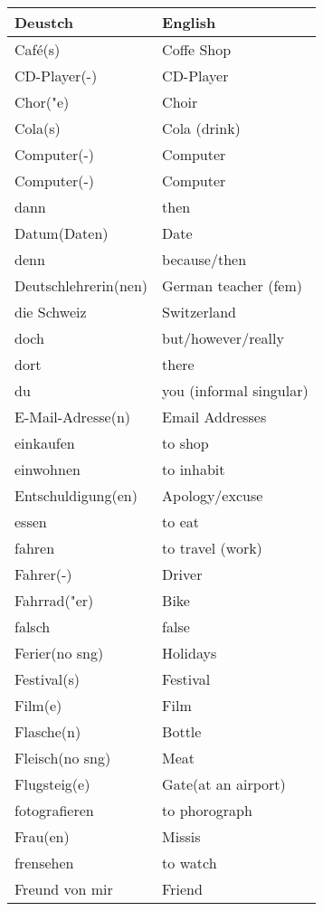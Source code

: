 \documentclass{article}
\renewcommand{\arraystretch}{1}
\begin{document}
\hfill
\begin{minipage}{0.48\textwidth}
    \centering
    \renewcommand{\arraystretch}{1.5}
    \begin{tabular}{|>{\raggedright\arraybackslash}p{3.5cm}|>{\raggedright\arraybackslash}p{3.5cm}|}
        \hline
        \rowcolor{gray!20} \textbf{Deustch} & \textbf{English} \\
        \hline
        Café(s) & Coffe Shop \\\hline
        CD-Player(-) & CD-Player \\\hline
        Chor("e) & Choir \\\hline
        Cola(s) & Cola (drink) \\\hline
        Computer(-) & Computer \\\hline
        Computer(-) & Computer \\\hline
        dann & then \\\hline
        Datum(Daten) & Date \\\hline
        denn & because/then \\\hline
        Deutschlehrerin(nen) & German teacher (fem) \\\hline
        die Schweiz & Switzerland \\\hline
        doch & but/however/really \\\hline
        dort & there \\\hline
        du & you (informal singular) \\\hline
        E-Mail-Adresse(n) & Email Addresses \\\hline
        einkaufen & to shop \\\hline
        einwohnen & to inhabit \\\hline
        Entschuldigung(en) & Apology/excuse \\\hline
        essen & to eat \\\hline
        fahren & to travel (work) \\\hline
        Fahrer(-) & Driver \\\hline
        Fahrrad("er) & Bike \\\hline
        falsch & false \\\hline
        Ferier(no sng) & Holidays \\\hline
        Festival(s) & Festival \\\hline
        Film(e) & Film \\\hline
        Flasche(n) & Bottle \\\hline
        Fleisch(no sng) & Meat \\\hline
        Flugsteig(e) & Gate(at an airport) \\\hline
        fotografieren & to phorograph \\\hline
        Frau(en) & Missis \\\hline
        frensehen & to watch  \\\hline
        Freund von mir & Friend \\\hline
    \end{tabular}
\end{minipage}
\end{document}
